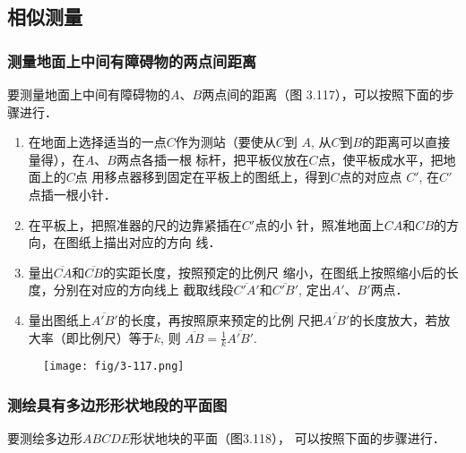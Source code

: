 \subsection{相似测量}
\subsubsection{测量地面上中间有障碍物的两点间距离}
要测量地面上中间有障碍物的$A$、$B$两点间的距离（图
3.117），可以按照下面的步骤进行．

\begin{enumerate}
    \item 在地面上选择适当的一点$C$作为测站（要使从$C$到
$A$, 从$C$到$B$的距离可以直接量得），在$A$、$B$两点各插一根
标杆，把平板仪放在$C$点，使平板成水平，把地面上的$C$点
用移点器移到固定在平板上的图纸上，得到$C$点的对应点
$C'$, 在$C'$点插一根小针．
\item 在平板上，把照准器的尺的边靠紧插在$C'$点的小
针，照准地面上$CA$和$CB$的方向，在图纸上描出对应的方向
线．
\item 量出$\overline{CA}$和$\overline{CB}$的实距长度，按照预定的比例尺
缩小，在图纸上按照缩小后的长度，分别在对应的方向线上
截取线段$\overline{C'A'}$和$\overline{C'B'}$, 定出$A'$、$B'$两点．
\item 量出图纸上$\overline{A'B'}$的长度，再按照原来预定的比例
尺把$\overline{A'B'}$的长度放大，若放大率（即比例尺）等于$k$, 则
$\overline{AB}=\frac{1}{k}\overline{A'B'}$.
\end{enumerate}

\begin{figure}[htp]
    \centering
\texttt{[image: fig/3-117.png]}
    \caption{}
\end{figure}

\subsubsection{测绘具有多边形形状地段的平面图}
要测绘多边形$ABCDE$形状地块的平面（图3.118），
可以按照下面的步骤进行．

\begin{figure}[htp]
    \centering
{}
    \caption{}
\end{figure}


